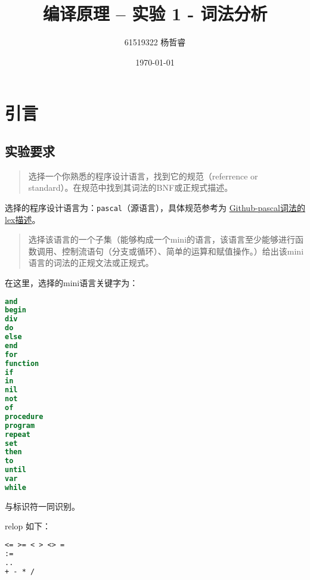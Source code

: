 \documentclass[lang=cn]{elegantpaper}
\title{编译原理 -- 实验 1 - 词法分析}
\author{61519322 杨哲睿}
\date{\today}
\begin{document}
\maketitle

\tableofcontents




\section{引言}

\subsection{实验要求}

\begin{quote}
    选择一个你熟悉的程序设计语言，找到它的规范（referrence or standard）。在规范中找到其词法的BNF或正规式描述。
\end{quote}

\begin{remark}
    选择的程序设计语言为：\lstinline|pascal|（源语言），具体规范参考为 \hyperref{https://github.com/bonzini/flex/blob/master/examples/manual/pascal.lex}{}{}{Github-pascal词法的lex描述}。
\end{remark}

\begin{quotation}
    选择该语言的一个子集（能够构成一个mini的语言，该语言至少能够进行函数调用、控制流语句（分支或循环）、简单的运算和赋值操作。）给出该mini语言的词法的正规文法或正规式。
    
\end{quotation}

在这里，选择的mini语言关键字为：

\begin{lstlisting}[language=pascal]
and
begin
div
do
else
end
for
function
if
in
nil
not
of
procedure
program
repeat
set
then
to
until
var
while
\end{lstlisting}
与标识符一同识别。

relop 如下：

\begin{lstlisting}[language=pascal]
<= >= < > <> =
:=
..
+ - * /
\end{lstlisting}
\end{document}
